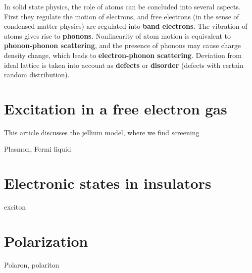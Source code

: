 \documentclass[hyperref, a4paper]{article}
\newcommand*{\concept}[1]{{\textbf{#1}}}
\begin{document}
In solid state physics, the role of atoms can be concluded into several aspects. First they regulate 
the motion of electrons, and free electrons (in the sense of condensed matter physics) are regulated 
into \concept{band electrons}. The vibration of atoms gives rise to \concept{phonons}. Nonlinearity of 
atom motion is equivalent to \concept{phonon-phonon scattering}, and the presence of phonons may cause 
charge density change, which leads to \concept{electron-phonon scattering}. Deviation from ideal lattice
is taken into account as \concept{defects} or \concept{disorder} (defects with certain random distribution).

\section{Excitation in a free electron gas}

\href{electron-gas.pdf}{This article} discusses the jellium model, where we find screening 

Plasmon, Fermi liquid

\section{Electronic states in insulators}

exciton

\section{Polarization}

Polaron, polariton
\end{document}
